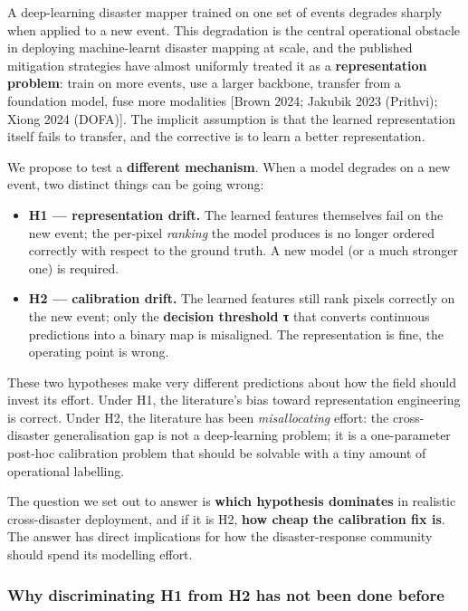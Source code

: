 A deep-learning disaster mapper trained on one set of events degrades
sharply when applied to a new event. This degradation is the central
operational obstacle in deploying machine-learnt disaster mapping at
scale, and the published mitigation strategies have almost uniformly
treated it as a \textbf{representation problem}: train on more events, use a
larger backbone, transfer from a foundation model, fuse more modalities
{[}Brown 2024; Jakubik 2023 (Prithvi); Xiong 2024 (DOFA){]}. The implicit assumption is that the learned representation
itself fails to transfer, and the corrective is to learn a better
representation.

We propose to test a \textbf{different mechanism}. When a model degrades on a
new event, two distinct things can be going wrong:

\begin{itemize}
\tightlist
\item
  \textbf{H1 --- representation drift.} The learned features themselves fail
  on the new event; the per-pixel \emph{ranking} the model produces is no
  longer ordered correctly with respect to the ground truth. A new model
  (or a much stronger one) is required.
\item
  \textbf{H2 --- calibration drift.} The learned features still rank pixels
  correctly on the new event; only the \textbf{decision threshold τ} that
  converts continuous predictions into a binary map is misaligned. The
  representation is fine, the operating point is wrong.
\end{itemize}

These two hypotheses make very different predictions about how the field
should invest its effort. Under H1, the literature's bias toward
representation engineering is correct. Under H2, the literature has been
\emph{misallocating} effort: the cross-disaster generalisation gap is not a
deep-learning problem; it is a one-parameter post-hoc calibration
problem that should be solvable with a tiny amount of operational
labelling.

The question we set out to answer is \textbf{which hypothesis dominates} in
realistic cross-disaster deployment, and if it is H2, \textbf{how cheap the
calibration fix is}. The answer has direct implications for how the
disaster-response community should spend its modelling effort.

\subsubsection{Why discriminating H1 from H2 has not been done before}\label{why-discriminating-h1-from-h2-has-not-been-done-before}

